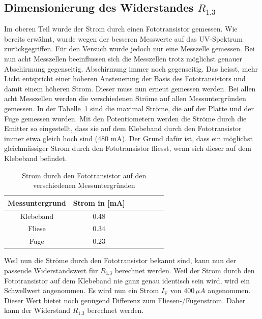 \documentclass[main.tex]{subfiles} %
\begin{document}
\subsection*{Dimensionierung des Widerstandes $R_{1.3}$}
Im oberen Teil wurde der Strom durch einen Fototransistor gemessen. Wie bereits erwähnt, wurde wegen der besseren Messwerte auf das UV-Spektrum
zurückgegriffen. Für den Versuch wurde jedoch nur eine Messzelle gemessen. Bei nun acht Messzellen beeinflussen sich die Messzellen trotz möglichst genauer Abschirmung gegenseitig.
Abschirmung immer noch gegenseitig. Das heisst, mehr Licht entspricht einer höheren Ansteuerung der Basis des Fototransistors und damit einem höheren Strom.
Dieser muss nun erneut gemessen werden. Bei allen acht Messzellen werden die verschiedenen Ströme auf allen Messuntergründen gemessen. In der Tabelle~\ref{tab:Strommessungen_alle} sind die maximal
Ströme, die auf der Platte und der Fuge gemessen wurden. Mit den Potentiometern werden die Ströme durch die Emitter so eingestellt, dass sie auf dem Klebeband durch den Fototransistor immer
etwa gleich hoch sind (480 mA). Der Grund dafür ist, dass ein möglichst gleichmässiger Strom durch den Fototransistor fliesst, wenn sich dieser auf dem Klebeband befindet.
\begin{table}[h]
    \centering
    \begin{tabular}{|c|c|c|c|c|c|c|}
        \hline
        \textbf{Messuntergrund} & \textbf{Strom in [mA]} \\ \hline
        Klebeband               & 0.48                   \\ \hline
        Fliese                  & 0.34                   \\ \hline
        Fuge                    & 0.23                   \\ \hline

    \end{tabular}
    \caption{Strom durch den Fototransistor auf den verschiedenen Messuntergründen}
    \label{tab:Strommessungen_alle}
\end{table}

Weil nun die Ströme durch den Fototransistor bekannt sind, kann nun der
passende Widerstandswert für $R_{1.3}$ berechnet werden. Weil der Strom durch
den Fototransistor auf dem Klebeband nie ganz genau identisch sein wird, wird
ein Schwellwert angenommen. Es wird nun ein Strom $I_{\text{F}}$ von $400 \,
    \mu A$ angenommen. Dieser Wert bietet noch genügend Differenz zum
Fliesen-/Fugenstrom. Daher kann der Widerstand $R_{1.3}$ berechnet werden.
\end{document}
